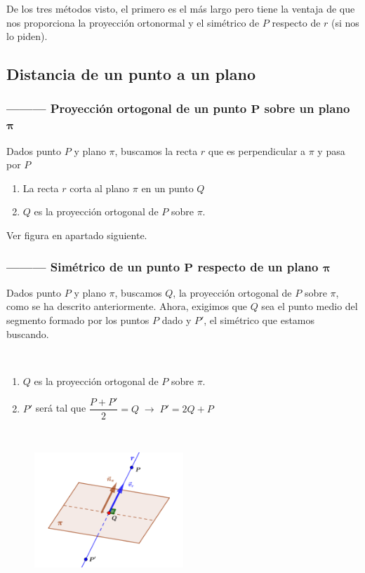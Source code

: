 De los tres métodos visto, el primero es el más largo pero tiene la ventaja de que nos proporciona la proyección ortonormal y el simétrico de $P$ respecto de $r$ (si nos lo piden).



\subsection{Distancia de un punto a un plano}

\subsubsection{--------- Proyección ortogonal de un punto $\boldsymbol{P}$ sobre un plano $\boldsymbol{\pi}$}

Dados punto $P$ y plano $\pi$, buscamos la recta $r$ que es perpendicular a $\pi$ y pasa por $P$

\begin{enumerate}
\item La recta $r$ corta al plano $\pi$ en un punto $Q$ 
\item $Q$ es la proyección ortogonal de $P$ sobre $\pi$.
\end{enumerate}
Ver figura en apartado siguiente.

\subsubsection{--------- Simétrico de un punto $\boldsymbol{P}$ respecto de un plano $\boldsymbol{\pi}$}
Dados punto $P$ y plano $\pi$, buscamos $Q$, la proyección ortogonal de $P$ sobre $\pi$, como se ha descrito anteriormente. Ahora, exigimos que $Q$ sea el punto medio del segmento formado por los puntos $P$ dado y $P'$, el simétrico que estamos buscando.
\begin{multicols}{2}

$\quad$

\begin{enumerate}
\item $Q$ es la proyección ortogonal de $P$ sobre $\pi$.
\item $P'$ será tal que $\dfrac {P+P'}{2}=Q \;\to\; P'=2Q+P$	
\end{enumerate}

$\quad$

	\begin{figure}[H]
		\centering
		\includegraphics[width=0.5\textwidth]{imagenes/imagenes11/T11IM08.png}
	\end{figure}
	
\end{multicols}

